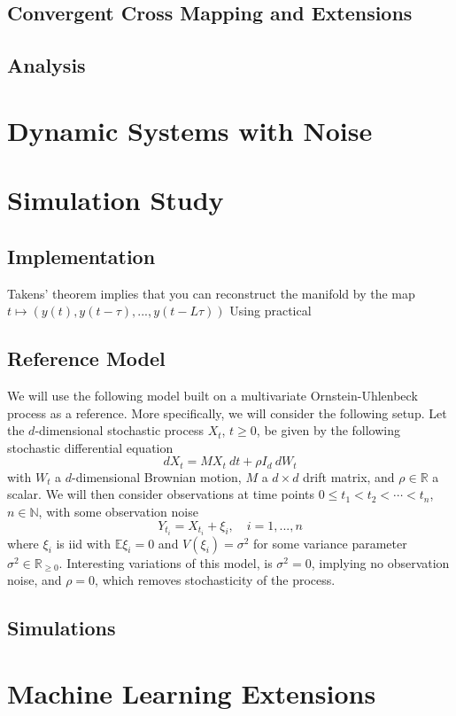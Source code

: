 \documentclass[11pt, a4paper]{memoir}
\theoremstyle{plain}
\theoremstyle{definition}
\begin{document}
\section{Convergent Cross Mapping and Extensions}

\section{Analysis}


\chapter{Dynamic Systems with Noise}
 



\chapter{Simulation Study}
\section{Implementation}
Takens' theorem implies that you can reconstruct the manifold by the map
$t\mapsto (y(t),y(t-\tau),...,y(t-L\tau))$
Using practical  
\section{Reference Model}
We will use the following model built on a multivariate Ornstein-Uhlenbeck process as a reference. More specifically, we will consider the following setup. Let the $d$-dimensional stochastic process $X_t$, $t\geq 0$, be given by the following stochastic differential equation
$$dX_t=M X_t\ dt+\rho I_d\ dW_t$$
with $W_t$ a $d$-dimensional  Brownian motion, $M$ a $d\times d$ drift matrix, and $\rho\in \mathbb{R}$ a scalar. We will then consider observations at time points $0\leq t_1<t_2<\cdots <t_n$, $n\in \mathbb{N}$, with some observation noise
$$Y_{t_i}=X_{t_i}+\xi_i,\quad i=1,...,n$$
where $\xi_i$ is iid with $\mathbb{E} \xi_i=0$ and $V(\xi_i)=\sigma^2$ for some variance parameter $\sigma^2\in \mathbb{R}_{\geq 0}$. Interesting variations of this model, is $\sigma^2=0$, implying no observation noise, and $\rho=0$, which removes stochasticity of the process.

\section{Simulations}
 

\chapter{Machine Learning Extensions}


\end{document}
